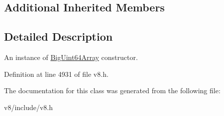 \subsection*{Additional Inherited Members}


\subsection{Detailed Description}
An instance of \mbox{\hyperlink{classv8_1_1BigUint64Array}{Big\+Uint64\+Array}} constructor. 

Definition at line 4931 of file v8.\+h.



The documentation for this class was generated from the following file\+:\begin{DoxyCompactItemize}
\item 
v8/include/v8.\+h\end{DoxyCompactItemize}

